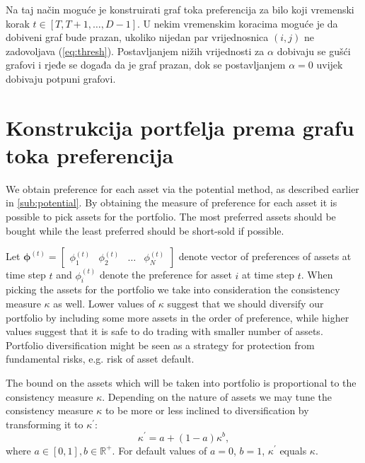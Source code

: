 \documentclass[lmodern, utf8, diplomski, numeric]{fer}
\newcommand{\matr}[1]{\mathbold{#1}}
\begin{document}
  Na taj način moguće je konstruirati graf toka preferencija za bilo koji vremenski korak $t \in \left[T, T + 1, \ldots, D-1\right]$.
  U nekim vremenskim koracima moguće je da dobiveni graf bude prazan, ukoliko nijedan par vrijednosnica $(i,j)$ ne zadovoljava (\ref{eq:thresh}).
  Postavljanjem nižih vrijednosti za $\alpha$ dobivaju se gušći grafovi i rjeđe se događa da je graf prazan, dok se postavljanjem $\alpha = 0$ uvijek dobivaju potpuni grafovi.
  
  \section{Konstrukcija portfelja prema grafu toka preferencija}
  We obtain preference for each asset via the potential method, as described earlier in \ref{sub:potential}.
  By obtaining the measure of preference for each asset it is possible to pick assets for the portfolio.
  The most preferred assets should be bought while the least preferred should be short-sold if possible.
  
  Let $\matr{\phi}^{(t)} = \begin{bmatrix} \phi_1^{(t)} & \phi_2^{(t)} & \ldots & \phi_N^{(t)} \end{bmatrix}$ denote vector of preferences of assets at time step $t$ and $\phi_i^{(t)}$ denote the preference for asset $i$ at time step $t$.
  When picking the assets for the portfolio we take into consideration the consistency measure $\kappa$ as well.
  Lower values of $\kappa$ suggest that we should diversify our portfolio by including some more assets in the order of preference, while higher values suggest that it is safe to do trading with smaller number of assets.
  Portfolio diversification might be seen as a strategy for protection from fundamental risks, e.g. risk of asset default.
  
  The bound on the assets which will be taken into portfolio is proportional to the consistency measure $\kappa$.
  Depending on the nature of assets we may tune the consistency measure $\kappa$ to be more or less inclined to diversification by transforming it to $\kappa^\prime$:
  \begin{equation}
  \kappa^\prime = a + (1 - a)\kappa^b,
  \end{equation}
  where $a \in [0, 1], b \in \mathbb{R}^+$.
  For default values of $a = 0$, $b = 1$, $\kappa^\prime$ equals $\kappa$.
  
\end{document}
